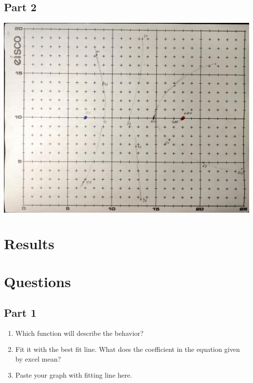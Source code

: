\documentclass[titlepage]{article}
\begin{document}
	\subsection{Part 2} 
	\begin{paracol}{2}
		\begin{minipage}[t]{0.5\textwidth}
			\includegraphics[width=1\linewidth, frame]{part2}
		\end{minipage}
	\end{paracol}
	\section{Results}
	\section{Questions}
	\subsection{Part 1}
		\begin{enumerate}
			\item Which function will describe the behavior?
			\item Fit it with the best fit line. What does the coefficient in the equation given by excel mean?
			\item Paste your graph with fitting line here.
		\end{enumerate}
\end{document}

